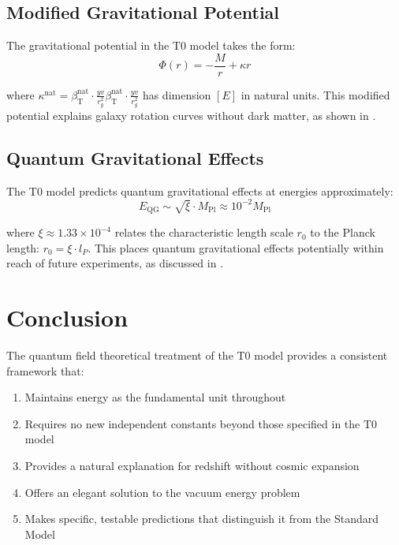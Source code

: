 \documentclass[12pt,a4paper]{article}
\newcommand{\betaT}{\beta_{\text{T}}}
\begin{document}
	\subsection{Modified Gravitational Potential}
	\label{subsec:potential_prediction}
	
	The gravitational potential in the T0 model takes the form:
	\begin{equation}
		\Phi(r) = -\frac{M}{r} + \kappa r
		\label{eq:grav_potential}
	\end{equation}
	
	where $\kappa^{\text{nat}} = \betaT^{\text{nat}} \cdot \frac{yv}{r_g^2}\betaT^{\text{nat}} \cdot \frac{yv}{r_g^2}$ has dimension $[E]$ in natural units. This modified potential explains galaxy rotation curves without dark matter, as shown in \cite{Pascher2025Galaxies}.
	
	\subsection{Quantum Gravitational Effects}
	\label{subsec:quantum_gravity}
	
	The T0 model predicts quantum gravitational effects at energies approximately:
	\begin{equation}
		E_{\text{QG}} \sim \sqrt{\xi} \cdot M_{\text{Pl}} \approx 10^{-2} M_{\text{Pl}}
		\label{eq:quantum_gravity_scale}
	\end{equation}
	
	where $\xi \approx 1.33 \times 10^{-4}$ relates the characteristic length scale $r_0$ to the Planck length: $r_0 = \xi \cdot l_P$. This places quantum gravitational effects potentially within reach of future experiments, as discussed in \cite{Pascher2025Planck}.
	
	\section{Conclusion}
	\label{sec:conclusion}
	
	The quantum field theoretical treatment of the T0 model provides a consistent framework that:
	
	\begin{enumerate}
		\item Maintains energy as the fundamental unit throughout
		\item Requires no new independent constants beyond those specified in the T0 model
		\item Provides a natural explanation for redshift without cosmic expansion
		\item Offers an elegant solution to the vacuum energy problem
		\item Makes specific, testable predictions that distinguish it from the Standard Model
	\end{enumerate}
	
\end{document}
